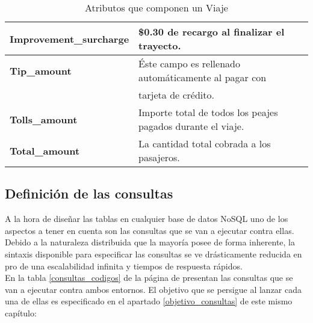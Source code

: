 \begin{table}[h!]
\begin{tabular}{|l||l|}
		\hline
	
		\textbf{Improvement\_surcharge} & \$0.30 de recargo al finalizar el trayecto. \\
		
		\hline
		
		\textbf{Tip\_amount} & Éste campo es rellenado automáticamente al pagar con \\
		                     & tarjeta de crédito. \\
		
		\hline
		 
		\textbf{Tolls\_amount} & Importe total de todos los peajes pagados durante el viaje.  \\
		
		\hline
		 
		\textbf{Total\_amount} & La cantidad total cobrada a los pasajeros. \\
		
		\hline
		
	\end{tabular}
	\caption{Atributos que componen un Viaje}
	\label{atributos_trip}
\end{table}

\subsection{Definición de las consultas}
\label{definicion_consultas}

A la hora de diseñar las tablas en cualquier base de datos NoSQL uno de los aspectos a tener en cuenta son las consultas que se van a ejecutar contra ellas. Debido a la naturaleza distribuida que la mayoría posee de forma inherente, la sintaxis disponible para especificar las consultas se ve drásticamente reducida en pro de una escalabilidad infinita y tiempos de respuesta rápidos.\\

En la tabla \ref{consultas_codigos} de la página \pageref{consultas_codigos} de presentan las consultas que se van a ejecutar contra ambos entornos. El objetivo que se persigue al lanzar cada una de ellas es especificado en el apartado \ref{objetivo_consultas} de este mismo capítulo:\\

